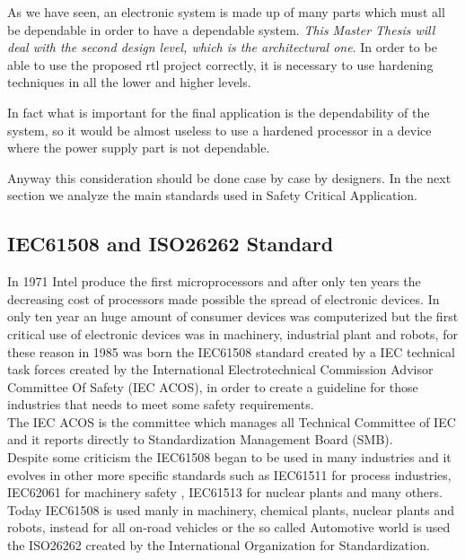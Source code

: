 {{{		
			As we have seen, an electronic system is made up of many parts which must all be dependable in order to have a dependable system. \textit{This Master Thesis will deal with the second design level, which is the architectural one}. 
			In order to be able to use the proposed rtl project correctly, it is necessary to use hardening techniques in all the lower and higher levels. 
			
			In fact what is important for the final application is the dependability of the system, so it would be almost useless to use a hardened processor in a device where the power supply part is not dependable.
			
			Anyway this consideration should be done case by case by designers. 
			In the next section we analyze the main standards used in Safety Critical Application.
		
		} %
		\newpage
		\subsection{IEC61508 and ISO26262 Standard}{
			In 1971 Intel produce the first microprocessors and after only ten years the decreasing cost of processors made possible the spread of electronic devices. In only ten year an huge amount of consumer devices was computerized but the first critical use of electronic devices was in machinery, industrial plant and robots, for these reason in 1985 was born the IEC61508 standard created by a IEC technical task forces created by the International Electrotechnical Commission Advisor Committee Of Safety (IEC ACOS), in order to create a guideline for those industries that needs to meet some safety requirements.\\
	
	        The IEC ACOS is the committee which manages all Technical Committee of IEC and it reports directly to Standardization Management Board (SMB).\\
	        
		    Despite some criticism the IEC61508 began to be used in many industries and it evolves in other more specific standards such as IEC61511 for process industries, IEC62061 for machinery safety ,  IEC61513 for nuclear plants and many others. Today IEC61508 is used manly in machinery, chemical plants, nuclear plants and robots, instead for all on-road vehicles or the so called Automotive world is used the ISO26262 created by the International Organization for Standardization.\\
		    
}}}
